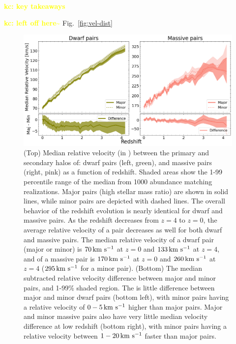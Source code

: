 \documentclass[twocolumn]{aastex631}
\newcommand{\kc}[1]{\textcolor{yellow}{\textbf{kc: #1}} }
\begin{document}
\kc{key takeaways}


\kc{left off here\~}
Fig.~\ref{fig:vel-dist}

\begin{figure}[htp]
  \centering
  \includegraphics[width=\textwidth]{velocity_1000.png}
  \caption{
    (Top) Median relative velocity (in \kms) between the primary and secondary halos of: dwarf pairs (left, green), and massive pairs (right, pink) as a function of redshift. 
    Shaded areas show the 1-99 percentile range of the median from 1000 abundance matching realizations. Major pairs (high stellar mass ratio) are shown in solid lines, while minor pairs are depicted with dashed lines.
    The overall behavior of the redshift evolution is nearly identical for dwarf and massive pairs.
    As the redshift decreases from $z=4$ to $z=0$, the average relative velocity of a pair decreases as well for both dwarf and massive pairs.
    The median relative velocity of a dwarf pair (major or minor) is $70\,\mathrm{km}~\mathrm{s}^{-1}$ at $z=0$ and $133\,\mathrm{km}~\mathrm{s}^{-1}$ at $z=4$, and of a massive pair is $170\,\mathrm{km}~\mathrm{s}^{-1}$ at $z=0$ and $260\,\mathrm{km}~\mathrm{s}^{-1}$ at $z=4$ ($295\,\mathrm{km}~\mathrm{s}^{-1}$ for a minor pair). 
    (Bottom) The median subtracted relative velocity difference between major and minor pairs, and 1-99\% shaded region.
    The is little difference between major and minor dwarf pairs (bottom left), with minor pairs having a relative velocity of $0-5\,\mathrm{km}~\mathrm{s}^{-1}$ higher than major pairs. 
    Major and minor massive pairs also have very little median velocity difference at low redshift (bottom right), with minor pairs having a relative velocity between $1-20\,\mathrm{km}~\mathrm{s}^{-1}$ faster than major pairs.
    }
  \label{fig:vel}
\end{figure}
\end{document}
